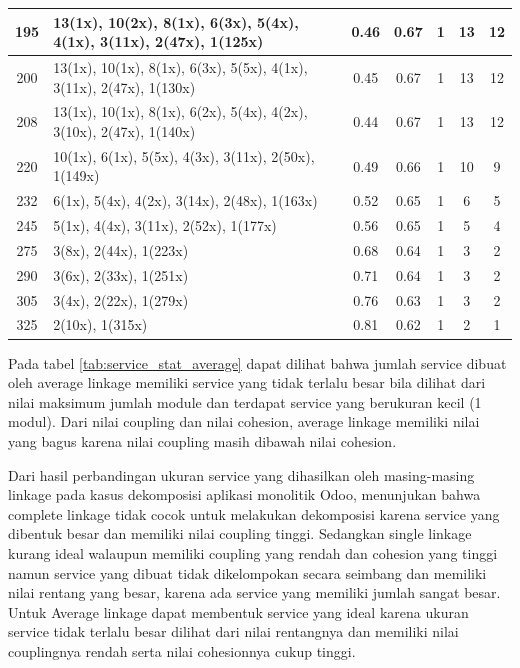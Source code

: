 \begin{small}
\begin{longtable}{|c|p{4cm}|c|c|c|c|c|}
195 & 13(1x), 10(2x), 8(1x), 6(3x), 5(4x), 4(1x), 3(11x), 2(47x), 1(125x) & 0.46 & 0.67 & 1 & 13 & 12 \\   \hline
200 & 13(1x), 10(1x), 8(1x), 6(3x), 5(5x), 4(1x), 3(11x), 2(47x), 1(130x) & 0.45 & 0.67 & 1 & 13 & 12 \\   \hline
208 & 13(1x), 10(1x), 8(1x), 6(2x), 5(4x), 4(2x), 3(10x), 2(47x), 1(140x) & 0.44 & 0.67 & 1 & 13 & 12 \\   \hline
220 & 10(1x), 6(1x), 5(5x), 4(3x), 3(11x), 2(50x), 1(149x) & 0.49 & 0.66 & 1 & 10 & 9 \\   \hline
232 & 6(1x), 5(4x), 4(2x), 3(14x), 2(48x), 1(163x) & 0.52 & 0.65 & 1 & 6 & 5 \\   \hline
245 & 5(1x), 4(4x), 3(11x), 2(52x), 1(177x) & 0.56 & 0.65 & 1 & 5 & 4 \\   \hline
275 & 3(8x), 2(44x), 1(223x) & 0.68 & 0.64 & 1 & 3 & 2 \\   \hline
290 & 3(6x), 2(33x), 1(251x) & 0.71 & 0.64 & 1 & 3 & 2 \\   \hline
305 & 3(4x), 2(22x), 1(279x) & 0.76 & 0.63 & 1 & 3 & 2 \\   \hline
325 & 2(10x), 1(315x) & 0.81 & 0.62 & 1 & 2 & 1 \\   \hline
\end{longtable}
\end{small}
\endgroup

Pada tabel \ref{tab:service_stat_average} dapat dilihat bahwa jumlah service dibuat oleh average linkage memiliki service yang tidak terlalu besar bila dilihat dari nilai maksimum jumlah module dan terdapat service yang berukuran kecil (1 modul). Dari nilai coupling dan nilai cohesion, average linkage memiliki nilai yang bagus karena nilai coupling masih dibawah nilai cohesion. 

Dari hasil perbandingan ukuran service yang dihasilkan oleh masing-masing linkage pada kasus dekomposisi aplikasi monolitik Odoo, menunjukan bahwa complete linkage tidak cocok untuk melakukan dekomposisi karena service yang dibentuk besar dan memiliki nilai coupling tinggi. Sedangkan single linkage kurang ideal walaupun memiliki coupling yang rendah dan cohesion yang tinggi namun service yang dibuat tidak dikelompokan secara seimbang dan memiliki nilai rentang yang besar, karena ada service yang memiliki jumlah sangat besar. Untuk Average linkage dapat membentuk service yang ideal karena ukuran service tidak terlalu besar dilihat dari nilai rentangnya dan memiliki nilai couplingnya rendah serta nilai cohesionnya cukup tinggi. 

